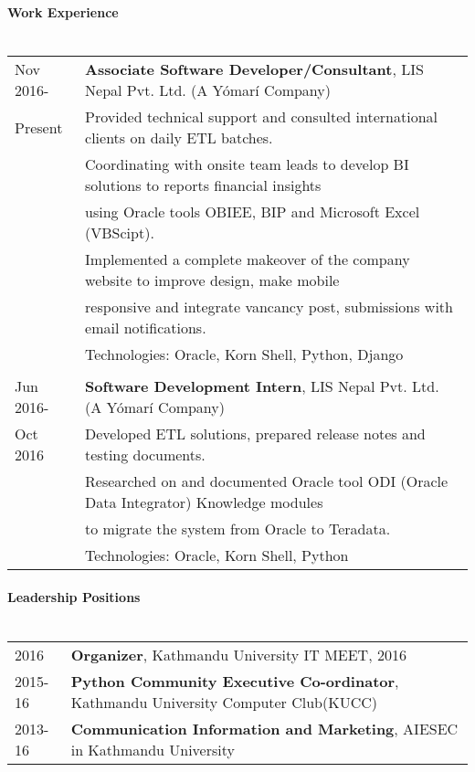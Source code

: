 \documentclass[letterpaper,10pt,oneside]{article}
\newcommand{\nextitem}{\par\hspace*{\labelsep}\textbullet\hspace*{\labelsep}}
\begin{document}
\paragraph{\large{Work Experience}\\\\}
\noindent \begin{tabular}{l l}
 Nov 2016-    & \textbf{Associate Software Developer/Consultant}, LIS Nepal Pvt. Ltd. (A Yómarí Company) \\
 Present      & \nextitem Provided technical support and consulted international clients on daily ETL batches. \\
              & \nextitem Coordinating with onsite team leads to develop BI solutions to reports financial insights \\
              & using Oracle tools OBIEE, BIP and Microsoft Excel (VBScipt). \\
              & \nextitem Implemented a complete makeover of the company website to improve design, make mobile \\
              & responsive and integrate vancancy post, submissions with email notifications. \\
              & Technologies: Oracle, Korn Shell, Python, Django \\
              \\
 Jun 2016-    & \textbf{Software Development Intern}, LIS Nepal Pvt. Ltd. (A Yómarí Company) \\
 Oct 2016     & \nextitem Developed ETL solutions, prepared release notes and testing documents. \\
              & \nextitem Researched on and documented Oracle tool ODI (Oracle Data Integrator) Knowledge modules \\
              & to migrate the system from Oracle to Teradata. \\
              & Technologies: Oracle, Korn Shell, Python \\
\end{tabular}

\paragraph{\large{Leadership Positions}\\\\}
\noindent \begin{tabular}{l l}
 2016       & \textbf{Organizer}, Kathmandu University IT MEET, 2016 \\
 2015-16    & \textbf{Python Community Executive Co-ordinator}, Kathmandu University Computer Club(KUCC) \\
 2013-16    & \textbf{Communication Information and Marketing}, AIESEC in Kathmandu University \\
\end{tabular}
\end{document}
